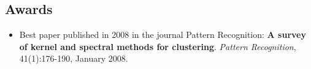 \documentclass[a4paper,10pt]{article}
\begin{document}
\subsection*{Awards}
\begin{itemize}
     \item Best paper published in 2008 in the journal Pattern Recognition:
       \textbf{A survey of kernel and spectral methods for clustering}.
       \emph{Pattern Recognition}, 41(1):176-190, January 2008.
\end{itemize}
\end{document}
